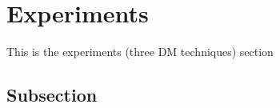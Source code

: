 \section{Experiments}\label{Section label}
This is the experiments (three DM techniques) section
\subsection{Subsection}\label{subsection}